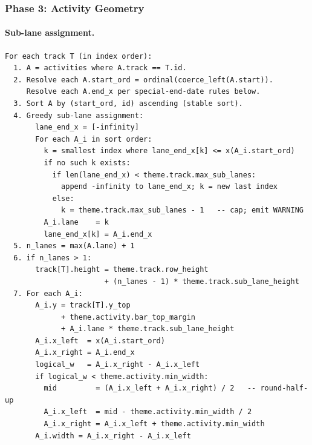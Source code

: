 \subsubsection{Phase 3: Activity Geometry}
\label{sec:phase3}

\paragraph{Sub-lane assignment.}

\begin{lstlisting}[caption={Phase 3: Activity geometry and greedy sub-lane assignment}]
For each track T (in index order):
  1. A = activities where A.track == T.id.
  2. Resolve each A.start_ord = ordinal(coerce_left(A.start)).
     Resolve each A.end_x per special-end-date rules below.
  3. Sort A by (start_ord, id) ascending (stable sort).
  4. Greedy sub-lane assignment:
       lane_end_x = [-infinity]
       For each A_i in sort order:
         k = smallest index where lane_end_x[k] <= x(A_i.start_ord)
         if no such k exists:
           if len(lane_end_x) < theme.track.max_sub_lanes:
             append -infinity to lane_end_x; k = new last index
           else:
             k = theme.track.max_sub_lanes - 1   -- cap; emit WARNING
         A_i.lane    = k
         lane_end_x[k] = A_i.end_x
  5. n_lanes = max(A.lane) + 1
  6. if n_lanes > 1:
       track[T].height = theme.track.row_height
                       + (n_lanes - 1) * theme.track.sub_lane_height
  7. For each A_i:
       A_i.y = track[T].y_top
             + theme.activity.bar_top_margin
             + A_i.lane * theme.track.sub_lane_height
       A_i.x_left  = x(A_i.start_ord)
       A_i.x_right = A_i.end_x
       logical_w   = A_i.x_right - A_i.x_left
       if logical_w < theme.activity.min_width:
         mid         = (A_i.x_left + A_i.x_right) / 2   -- round-half-up
         A_i.x_left  = mid - theme.activity.min_width / 2
         A_i.x_right = A_i.x_left + theme.activity.min_width
       A_i.width = A_i.x_right - A_i.x_left
\end{lstlisting}

